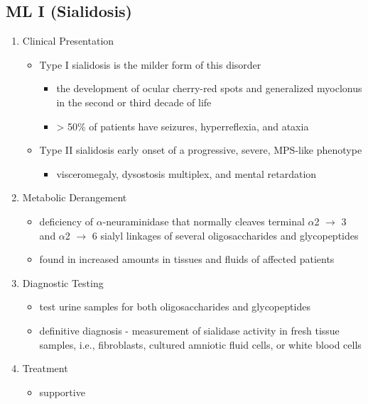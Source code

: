 \documentclass{scrartcl}
\begin{document}
\subsection{ML I (Sialidosis)}
\label{sec:org98e2219}
\begin{enumerate}
\item Clinical Presentation
\label{sec:org5994ed7}
\begin{itemize}
\item Type I sialidosis is the milder form of this disorder
\begin{itemize}
\item the development of ocular cherry-red spots and generalized
myoclonus in the second or third decade of life
\item \textgreater{} 50\% of patients have seizures, hyperreflexia, and ataxia
\end{itemize}

\item Type II sialidosis early onset of a progressive, severe, MPS-like
phenotype
\begin{itemize}
\item visceromegaly, dysostosis multiplex, and mental retardation
\end{itemize}
\end{itemize}

\item Metabolic Derangement
\label{sec:org1d90fb4}
\begin{itemize}
\item deficiency of \(\alpha\)-neuraminidase that normally cleaves terminal
\(\alpha\)2 \(\to\) 3 and \(\alpha\)2 \(\to\) 6 sialyl linkages of several
oligosaccharides and glycopeptides
\item found in increased amounts in tissues and fluids of affected patients
\end{itemize}

\item Diagnostic Testing
\label{sec:org5a3d3b1}
\begin{itemize}
\item test urine samples for both oligosaccharides and glycopeptides
\item definitive diagnosis - measurement of sialidase activity in fresh
tissue samples, i.e., fibroblasts, cultured amniotic fluid cells,
or white blood cells
\end{itemize}

\item Treatment
\label{sec:org6cc732f}
\begin{itemize}
\item supportive
\end{itemize}
\end{enumerate}
\end{document}
